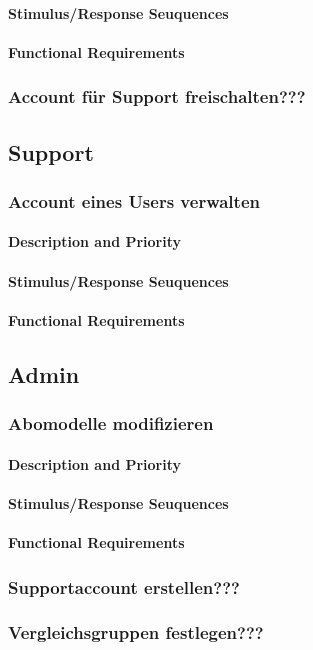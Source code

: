 \paragraph{Stimulus/Response Seuquences}
\paragraph{Functional Requirements}

\subsubsection{Account für Support freischalten???}


\subsection{Support}
\subsubsection{Account eines Users verwalten}
\paragraph{Description and Priority}
\paragraph{Stimulus/Response Seuquences}
\paragraph{Functional Requirements}


\subsection{Admin}
\subsubsection{Abomodelle modifizieren}
\paragraph{Description and Priority}
\paragraph{Stimulus/Response Seuquences}
\paragraph{Functional Requirements}

\subsubsection{Supportaccount erstellen???}

\subsubsection{Vergleichsgruppen festlegen???}